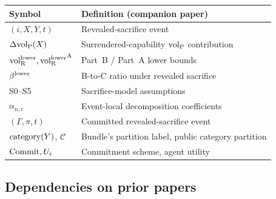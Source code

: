 \begin{center}
\small
\begin{tabular}{@{}ll@{}}
\toprule
\textbf{Symbol} & \textbf{Definition (companion paper)} \\
\midrule
$(i, X, Y, t)$ & Revealed-sacrifice event \\
$\Delta{\operatorname{vol}_{\mathrm{P}}}(X)$ & Surrendered-capability ${\operatorname{vol}_{\mathrm{P}}}$ contribution \\
${\operatorname{vol}_{\mathrm{R}}^{\mathrm{lower}}}, {\operatorname{vol}_{\mathrm{R}}^{\mathrm{lower}}}^{\mathrm{A}}$ & Part~B / Part~A lower
  bounds \\
$\beta^{\mathrm{lower}}$ & B-to-C ratio under revealed sacrifice \\
S0--S5 & Sacrifice-model assumptions \\
$\alpha_{n,c}$ & Event-local decomposition coefficients \\
$(\Gamma, \pi, t)$ & Committed revealed-sacrifice event \\
$\mathrm{category}(Y)$, $\mathcal{C}$ & Bundle's partition label, public
  category partition \\
$\mathrm{Commit}, U_i$ & Commitment scheme, agent utility \\
\bottomrule
\end{tabular}
\end{center}

\subsection{Dependencies on prior papers}


